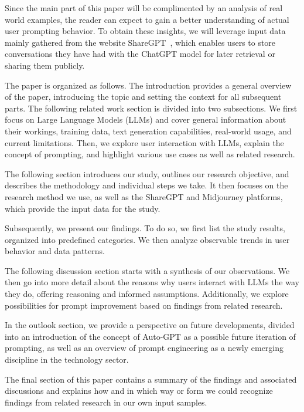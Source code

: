 Since the main part of this paper will be complimented by an analysis of real world examples, the
reader can expect to gain a better understanding of actual user prompting behavior.
To obtain these insights, we will leverage input data mainly gathered from the website
ShareGPT~\cite{sharegpt_sharegpt_2023}, %
which enables users to store conversations they have had with the ChatGPT model for later retrieval
or sharing them publicly.


The paper is organized as follows.
The introduction provides a general overview of the paper, introducing the topic and setting the context for all
subsequent parts.
The following related work section is divided into two subsections.
We first focus on Large Language Models (LLMs) and cover general information about their
workings, training data, text generation capabilities, real-world usage, and current limitations.
Then, we explore user interaction with LLMs, explain the concept of prompting, and highlight
various use cases as well as related research.

The following section introduces our study, outlines our research objective, and
describes the methodology and individual steps we take.
It then focuses on the research method we use, as well as the ShareGPT and Midjourney platforms,
which provide the input data for the study.

Subsequently, we present our findings.
To do so, we first list the study results, organized into predefined categories.
We then analyze observable trends in user behavior and data patterns.

The following discussion section starts with a synthesis of our observations.
We then go into more detail about the reasons why users interact with LLMs the way they do,
offering reasoning and informed assumptions.
Additionally, we explore possibilities for prompt improvement based on findings from related
research.

In the outlook section, we provide a perspective on future developments, divided into an
introduction of the concept of Auto-GPT as a possible future iteration of prompting, as well as an
overview of prompt engineering as a newly emerging discipline in the technology sector.

The final section of this paper contains a summary of the findings and associated discussions and
explains how and in which way or form we could recognize findings from related research in our
own input samples.